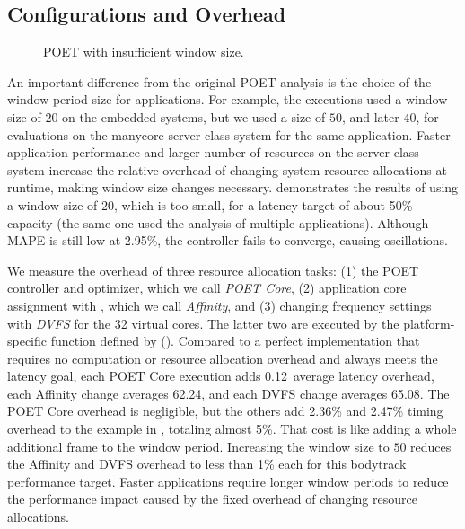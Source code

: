 \subsection{Configurations and Overhead}

\begin{figure}[t]
  \centering
      
  \caption{POET with insufficient window size.}
  \label{fig:poet-bodytrack-w20}
\end{figure}

An important difference from the original POET analysis is the choice of the window period size for applications.
For example, the  executions used a window size of $20$ on the embedded systems, but we used a size of $50$, and later $40$, for evaluations on the manycore server-class system for the same application.
Faster application performance and larger number of resources on the server-class system increase the relative overhead of changing system resource allocations at runtime, making window size changes necessary.
 demonstrates the results of using a window size of $20$, which is too small, for a latency target of about 50\% capacity (the same one used the analysis of multiple applications).
Although MAPE is still low at 2.95\%, the controller fails to converge, causing oscillations.

We measure the overhead of three resource allocation tasks: (1) the POET controller and optimizer, which we call \textit{POET Core}, (2) application core assignment with , which we call \textit{Affinity}, and (3) changing frequency settings with \textit{DVFS} for the 32 virtual cores.
The latter two are executed by the platform-specific function defined by  ().
Compared to a perfect implementation that requires no computation or resource allocation overhead and always meets the latency goal, each POET Core execution adds 0.12\ms~average latency overhead, each Affinity change averages 62.24\ms, and each DVFS change averages 65.08\ms.
The POET Core overhead is negligible, but the others add 2.36\% and 2.47\% timing overhead to the example in , totaling almost 5\%.
That cost is like adding a whole additional frame to the window period.
Increasing the window size to $50$ reduces the Affinity and DVFS overhead to less than 1\% each for this bodytrack performance target.
Faster applications require longer window periods to reduce the performance impact caused by the fixed overhead of changing resource allocations.

